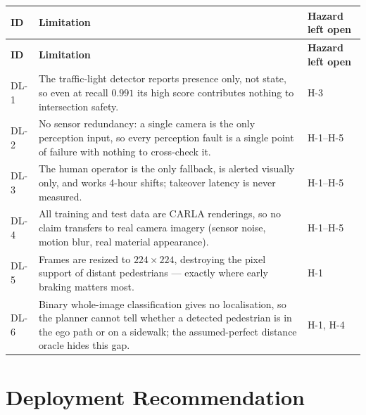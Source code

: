 \documentclass[a4paper,12pt]{article}
\begin{document}
{\footnotesize
\begin{longtable}{@{}P{0.9cm}P{11.5cm}P{2.1cm}@{}}
\toprule
\textbf{ID} & \textbf{Limitation} & \textbf{Hazard left open} \\
\midrule
\endfirsthead
\toprule
\textbf{ID} & \textbf{Limitation} & \textbf{Hazard left open} \\
\midrule
\endhead
\bottomrule
\endlastfoot
DL-1 & The traffic-light detector reports presence only, not state, so even at recall
       $0.991$ its high score contributes nothing to intersection safety.
     & H-3 \\
DL-2 & No sensor redundancy: a single camera is the only perception input, so every
       perception fault is a single point of failure with nothing to cross-check it.
     & H-1--H-5 \\
DL-3 & The human operator is the only fallback, is alerted visually only, and works
       4-hour shifts; takeover latency is never measured.
     & H-1--H-5 \\
DL-4 & All training and test data are CARLA renderings, so no claim transfers to real
       camera imagery (sensor noise, motion blur, real material appearance).
     & H-1--H-5 \\
DL-5 & Frames are resized to $224\times224$, destroying the pixel support of distant
       pedestrians --- exactly where early braking matters most.
     & H-1 \\
DL-6 & Binary whole-image classification gives no localisation, so the planner cannot tell
       whether a detected pedestrian is in the ego path or on a sidewalk; the
       assumed-perfect distance oracle hides this gap.
     & H-1, H-4 \\
\end{longtable}}



\section{Deployment Recommendation}
\label{sec:deployment}
\end{document}
